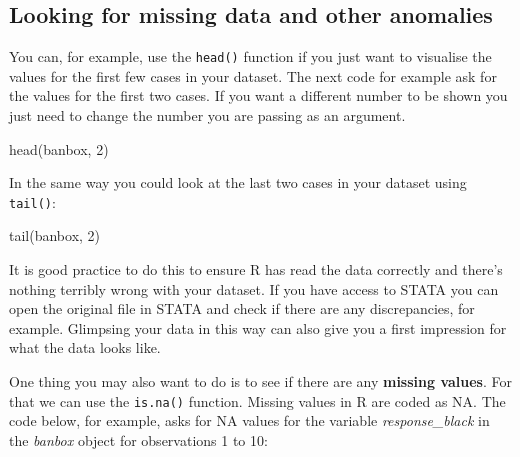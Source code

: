 \documentclass[
]{book}
\newenvironment{Shaded}{\begin{snugshade}}{\end{snugshade}}
\newcommand{\DecValTok}[1]{\textcolor[rgb]{0.00,0.00,0.81}{#1}}
\newcommand{\FunctionTok}[1]{\textcolor[rgb]{0.00,0.00,0.00}{#1}}
\newcommand{\NormalTok}[1]{#1}
\newcommand{\SpecialCharTok}[1]{\textcolor[rgb]{0.00,0.00,0.00}{#1}}
\begin{document}
\hypertarget{looking-for-missing-data-and-other-anomalies}{%
\subsection{Looking for missing data and other anomalies}\label{looking-for-missing-data-and-other-anomalies}}

You can, for example, use the \texttt{head()} function if you just want to visualise the values for the first few cases in your dataset. The next code for example ask for the values for the first two cases. If you want a different number to be shown you just need to change the number you are passing as an argument.

\begin{Shaded}
\begin{Highlighting}[]
\FunctionTok{head}\NormalTok{(banbox, }\DecValTok{2}\NormalTok{)}
\end{Highlighting}
\end{Shaded}

In the same way you could look at the last two cases in your dataset using \texttt{tail()}:

\begin{Shaded}
\begin{Highlighting}[]
\FunctionTok{tail}\NormalTok{(banbox, }\DecValTok{2}\NormalTok{)}
\end{Highlighting}
\end{Shaded}

It is good practice to do this to ensure R has read the data correctly and there's nothing terribly wrong with your dataset. If you have access to STATA you can open the original file in STATA and check if there are any discrepancies, for example. Glimpsing your data in this way can also give you a first impression for what the data looks like.

One thing you may also want to do is to see if there are any \textbf{missing values}. For that we can use the \texttt{is.na()} function. Missing values in R are coded as NA. The code below, for example, asks for NA values for the variable \emph{response\_black} in the \emph{banbox} object for observations 1 to 10:

\begin{Shaded}
\end{Shaded}
\end{document}
